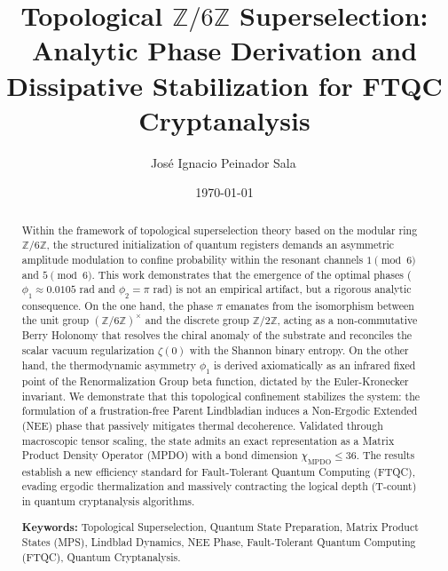 \documentclass[reprint,aps,pra,superscriptaddress,nofootinbib]{revtex4-2}
\theoremstyle{plain}
\theoremstyle{definition}
\theoremstyle{remark}
\begin{document}
\title{Topological $\mathbb{Z}/6\mathbb{Z}$ Superselection: Analytic Phase Derivation and Dissipative Stabilization for FTQC Cryptanalysis}

\author{Jos\'e Ignacio Peinador Sala\,}

\date{\today}

\begin{abstract}
Within the framework of topological superselection theory based on the modular ring $\mathbb{Z}/6\mathbb{Z}$, the structured initialization of quantum registers demands an asymmetric amplitude modulation to confine probability within the resonant channels $1 \pmod 6$ and $5 \pmod 6$. This work demonstrates that the emergence of the optimal phases ($\phi_1 \approx 0.0105$ rad and $\phi_2 = \pi$ rad) is not an empirical artifact, but a rigorous analytic consequence. On the one hand, the phase $\pi$ emanates from the isomorphism between the unit group $(\mathbb{Z}/6\mathbb{Z})^{\times}$ and the discrete group $\mathbb{Z}/2\mathbb{Z}$, acting as a non-commutative Berry Holonomy that resolves the chiral anomaly of the substrate and reconciles the scalar vacuum regularization $\zeta(0)$ with the Shannon binary entropy. On the other hand, the thermodynamic asymmetry $\phi_1$ is derived axiomatically as an infrared fixed point of the Renormalization Group beta function, dictated by the Euler-Kronecker invariant. We demonstrate that this topological confinement stabilizes the system: the formulation of a frustration-free Parent Lindbladian induces a Non-Ergodic Extended (NEE) phase that passively mitigates thermal decoherence. Validated through macroscopic tensor scaling, the state admits an exact representation as a Matrix Product Density Operator (MPDO) with a bond dimension $\chi_{\text{MPDO}} \le 36$. The results establish a new efficiency standard for Fault-Tolerant Quantum Computing (FTQC), evading ergodic thermalization and massively contracting the logical depth (T-count) in quantum cryptanalysis algorithms.

\vspace{0.5cm}
\noindent \textbf{Keywords:} Topological Superselection, Quantum State Preparation, Matrix Product States (MPS), Lindblad Dynamics, NEE Phase, Fault-Tolerant Quantum Computing (FTQC), Quantum Cryptanalysis.
\end{abstract}

\maketitle
\end{document}
